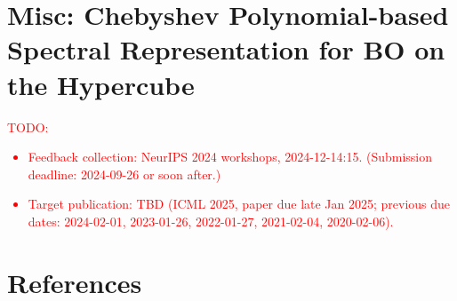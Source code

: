 \documentclass{article}
\begin{document}
%

\section{Misc: Chebyshev Polynomial-based Spectral Representation
  for BO on the Hypercube}

\textcolor{red}{TODO:
\begin{itemize}
\item
  Feedback collection: NeurIPS 2024 workshops, 2024-12-14:15.
  (Submission deadline: 2024-09-26 or soon after.)
\item
  Target publication: TBD (ICML 2025, paper due late Jan 2025; previous
  due dates: 2024-02-01, 2023-01-26, 2022-01-27, 2021-02-04,
  2020-02-06).
\end{itemize}
}



\section*{References}


\end{document}
